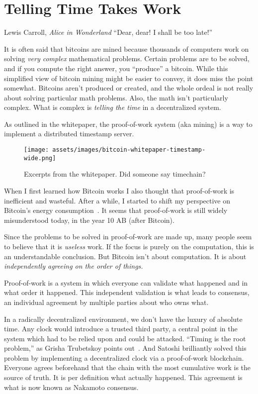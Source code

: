\chapter{Telling Time Takes Work}
\label{les:17}

\begin{chapquote}{Lewis Carroll, \textit{Alice in Wonderland}}
\enquote{Dear, dear! I shall be too late!}
\end{chapquote}

It is often said that bitcoins are mined because thousands of computers
work on solving \textit{very complex} mathematical problems. Certain problems
are to be solved, and if you compute the right answer, you \enquote{produce} a
bitcoin. While this simplified view of bitcoin mining might be easier to
convey, it does miss the point somewhat. Bitcoins aren't produced or
created, and the whole ordeal is not really about solving particular
math problems. Also, the math isn't particularly complex. What is
complex is \textit{telling the time} in a decentralized system.

As outlined in the whitepaper, the proof-of-work system (aka mining) is
a way to implement a distributed timestamp server.

\begin{figure}
  \texttt{[image: assets/images/bitcoin-whitepaper-timestamp-wide.png]}
  \caption{Excerpts from the whitepaper. Did someone say timechain?}
  \label{fig:bitcoin-whitepaper-timestamp-wide}
\end{figure}

When I first learned how Bitcoin works I also thought that proof-of-work
is inefficient and wasteful. After a while, I started to shift my
perspective on Bitcoin's energy consumption~\cite{gigi:energy}. It seems that
proof-of-work is still widely misunderstood today, in the year 10 AB
(after Bitcoin).

Since the problems to be solved in proof-of-work are made up, many
people seem to believe that it is \textit{useless} work. If the focus is purely
on the computation, this is an understandable conclusion. But Bitcoin
isn't about computation. It is about \textit{independently agreeing on the
order of things.}

Proof-of-work is a system in which everyone can validate what happened
and in what order it happened. This independent validation is what leads
to consensus, an individual agreement by multiple parties about who owns
what.

In a radically decentralized environment, we don't have the luxury of absolute
time. Any clock would introduce a trusted third party, a central point in the
system which had to be relied upon and could be attacked. \enquote{Timing is the root
problem,} as Grisha Trubetskoy points out~\cite{pow-clock}. And Satoshi
brilliantly solved this problem by implementing a decentralized clock via a
proof-of-work blockchain. Everyone agrees beforehand that the chain with the
most cumulative work is the source of truth. It is per definition what actually
happened. This agreement is what is now known as Nakamoto consensus.

